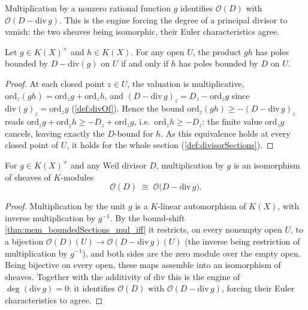 Multiplication by a nonzero rational function \(g\) identifies \(\mathcal O(D)\) with
\(\mathcal O(D - \mathrm{div}\, g)\). This is the engine forcing the degree of a principal divisor
to vanish: the two sheaves being isomorphic, their Euler characteristics agree.

\begin{theorem}
  \label{thm:mem_boundedSections_mul_iff}
  \leanok
  Let \(g \in K(X)^\times\) and \(h \in K(X)\). For any open \(U\), the product \(g h\) has poles
  bounded by \(D - \mathrm{div}(g)\) on \(U\) if and only if \(h\) has poles bounded by \(D\) on
  \(U\).
\end{theorem}
\begin{proof}
  \leanok
  At each closed point \(z \in U\), the valuation is multiplicative, \(\mathrm{ord}_z(gh) =
  \mathrm{ord}_z g + \mathrm{ord}_z h\), and \((D - \mathrm{div}\, g)_z = D_z - \mathrm{ord}_z g\)
  since \(\mathrm{div}(g)_z = \mathrm{ord}_z g\) (\ref{def:divOf}). Hence the bound
  \(\mathrm{ord}_z(gh) \ge -(D - \mathrm{div}\, g)_z\) reads
  \(\mathrm{ord}_z g + \mathrm{ord}_z h \ge -D_z + \mathrm{ord}_z g\), i.e.\ \(\mathrm{ord}_z h \ge
  -D_z\): the finite value \(\mathrm{ord}_z g\) cancels, leaving exactly the \(D\)-bound for \(h\).
  As this equivalence holds at every closed point of \(U\), it holds for the whole section
  (\ref{def:divisorSections}).
\end{proof}

\begin{theorem}
  \label{thm:mulEquivDivisorSheaf}
  \leanok
  For \(g \in K(X)^\times\) and any Weil divisor \(D\), multiplication by \(g\) is an isomorphism of
  sheaves of \(K\)-modules
  \[
    \mathcal O(D) \;\cong\; \mathcal O\bigl(D - \mathrm{div}\, g\bigr).
  \]
\end{theorem}
\begin{proof}
  \leanok
  Multiplication by the unit \(g\) is a \(K\)-linear automorphism of \(K(X)\), with inverse
  multiplication by \(g^{-1}\). By the bound-shift \ref{thm:mem_boundedSections_mul_iff} it
  restricts, on every nonempty open \(U\), to a bijection \(\mathcal O(D)(U) \to
  \mathcal O(D - \mathrm{div}\, g)(U)\) (the inverse being restriction of multiplication by
  \(g^{-1}\)), and both sides are the zero module over the empty open. Being bijective on every
  open, these maps assemble into an isomorphism of sheaves. Together with the additivity of
  \(\mathrm{div}\) this is the engine of \(\deg(\mathrm{div}\, g) = 0\): it identifies
  \(\mathcal O(D)\) with \(\mathcal O(D - \mathrm{div}\, g)\), forcing their Euler characteristics to
  agree.
\end{proof}

